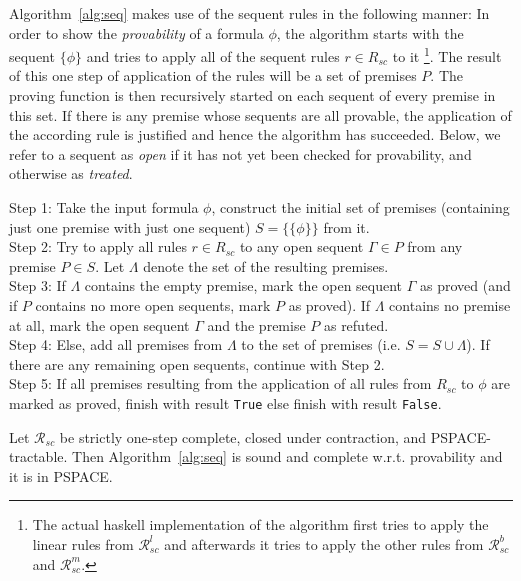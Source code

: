 \documentclass{entcs} \usepackage{entcsmacro}
\begin{document}
Algorithm~\ref{alg:seq} makes use of the sequent rules in the following manner:
In order to show the \emph{provability} of a formula $\phi$, the 
algorithm starts with the sequent $\{\phi\}$ and tries to apply all
of the sequent rules $r\in R_{sc}$ to it
\footnote{The actual haskell
implementation of the algorithm first tries to apply the linear rules
from $\mathcal{R}^l_{sc}$ and afterwards it tries to apply the other
rules from $\mathcal{R}^b_{sc}$ and $\mathcal{R}^m_{sc}$.}.
The result of this one step of application of the rules will be a set
of premises $P$. The proving function is then recursively started on
each sequent of every premise in this set. If there is any premise
whose sequents are all provable, the application of the according rule
is justified and hence the algorithm has succeeded. Below, we refer to
a sequent as \emph{open} if it has not yet been checked for
provability, and otherwise as \emph{treated}.

\begin{algorithm}[h]
\begin{alg}
\begin{upshape}
  Step 1: Take the input formula $\phi$, construct the initial set 
  of premises (containing just one premise with just one sequent)
  $S = \{\{\phi\}\}$ from it.\\
  Step 2: Try to apply all rules $r\in R_{sc}$ to any open sequent
  $\Gamma\in P$ from any premise $P\in S$. Let $\Lambda$ denote the set
  of the resulting premises.\\
  Step 3: If $\Lambda$ contains the empty premise, mark the open
  sequent $\Gamma$ as proved (and if $P$ contains no more open
  sequents, mark $P$ as proved). If $\Lambda$ contains no premise at
  all, mark the open sequent $\Gamma$ and the premise $P$ as refuted.\\
  Step 4: Else, add all premises from $\Lambda$ to the set of
  premises (i.e. $S=S\cup\Lambda$). If there are any remaining open
  sequents, continue with Step 2.\\
  Step 5: If all premises resulting from the application of all rules
  from $R_{sc}$ to $\phi$ are marked as proved, finish with result \verb|True|
  else finish with result \verb|False|.
\end{upshape}
\label{alg:seq}
\end{alg}
\end{algorithm}

\begin{proposition}
\begin{upshape}
Let $\mathcal{R}_{sc}$ be strictly one-step complete, closed under contraction,
and PSPACE-tractable. Then Algorithm~\ref{alg:seq} is sound and complete w.r.t. provability
and it is in PSPACE.
\end{upshape}
\end{proposition}
\end{document}
